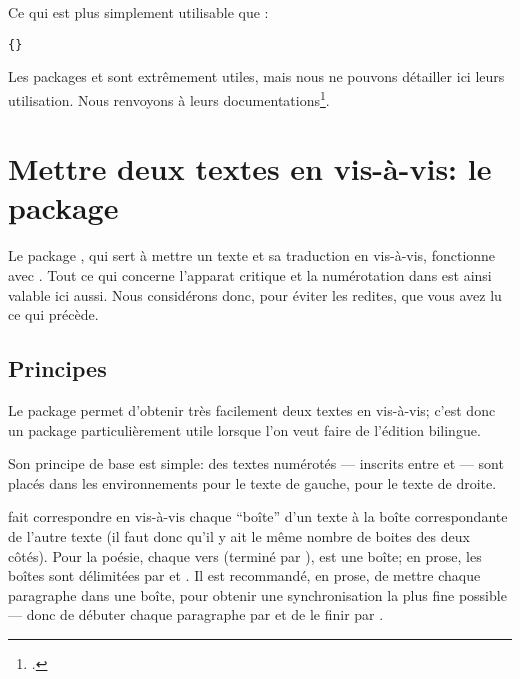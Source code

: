 Ce qui est  plus simplement utilisable que :

\verb|{|\verb|}|

\begin{plusloins}
Les packages  et  sont extrêmement utiles, mais nous ne pouvons détailler ici leurs utilisation. Nous renvoyons à leurs documentations\footcites{ifthen}{xargs}.
\end{plusloins}





 






\section{Mettre deux textes en vis-à-vis: le package }

\begin{prealable}
Le package , qui sert à mettre un texte et sa traduction en vis-à-vis, fonctionne avec . Tout ce qui concerne l'apparat critique et la numérotation dans  est ainsi valable ici aussi. Nous considérons donc, pour éviter les redites, que vous avez lu ce qui précède.
\end{prealable}


\subsection{Principes}

Le package  permet d'obtenir très facilement deux textes en vis-à-vis; c'est donc un package particulièrement utile lorsque l'on veut faire de l'édition bilingue.

Son principe de base est simple:  des textes numérotés  --- inscrits entre  et   --- sont placés dans les environnements  pour le texte de gauche,   pour le texte de droite.

 fait correspondre en vis-à-vis chaque \enquote{boîte} d'un texte à la boîte correspondante de l'autre texte (il faut donc qu'il y ait le même nombre de boites des deux côtés). Pour la poésie,  chaque vers  (terminé par \ampersand ), est une boîte;  en prose, les boîtes sont délimitées par   et  .  Il est recommandé, en prose, de mettre chaque paragraphe dans une boîte, pour obtenir une synchronisation la plus fine possible --- donc de débuter chaque paragraphe par  et de le finir par . 


